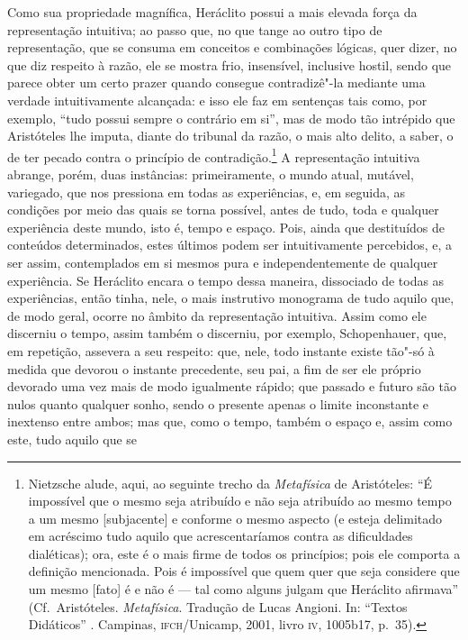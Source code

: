 Como sua propriedade magnífica, Heráclito possui a mais elevada força da
representação intuitiva; ao passo que, no que tange ao outro tipo de
representação, que se consuma em conceitos e combinações lógicas, quer dizer,
no que diz respeito à razão, ele se mostra frio, insensível, inclusive
hostil, sendo que parece obter um certo prazer quando consegue contradizê"-la
mediante uma verdade intuitivamente alcançada: e isso ele faz em sentenças
tais como, por exemplo, ``tudo possui sempre o contrário em si'', mas de modo
tão intrépido que Aristóteles lhe imputa, diante do tribunal da razão, o mais
alto delito, a saber, o de ter pecado contra o princípio de contradição.\footnote{
Nietzsche alude, aqui, ao seguinte trecho da \textit{Metafísica} de Aristóteles: 
``É impossível que o mesmo seja atribuído e não seja atribuído ao mesmo tempo 
a um mesmo [subjacente] e conforme o mesmo aspecto (e esteja delimitado 
em acréscimo tudo aquilo que acrescentaríamos contra as dificuldades dialéticas); 
ora, este é o mais firme de todos os princípios; pois ele comporta a definição 
mencionada. Pois é impossível que quem quer que seja considere que um mesmo [fato] 
é e não é --- tal como alguns julgam que Heráclito afirmava'' (Cf.~Aristóteles. 
\textit{Metafísica}. Tradução de Lucas Angioni. In: ``Textos Didáticos'' .
Campinas, \textsc{ifch}/Unicamp, 2001, livro \textsc{iv}, 1005b17, p.~35).} A
representação intuitiva abrange, porém, duas instâncias: primeiramente, o
mundo atual, mutável, variegado, que nos pressiona em todas as experiências,
e, em seguida, as condições por meio das quais se torna possível, antes de
tudo, toda e qualquer experiência deste mundo, isto é, tempo e espaço. Pois,
ainda que destituídos de conteúdos determinados, estes últimos podem ser
intuitivamente percebidos, e, a ser assim, contemplados em si mesmos pura e
independentemente de qualquer experiência. Se Heráclito encara o tempo dessa
maneira, dissociado de todas as experiências, então tinha, nele, o mais
instrutivo monograma de tudo aquilo que, de modo geral, ocorre no âmbito da
representação intuitiva. Assim como ele discerniu o tempo, assim também o
discerniu, por exemplo, Schopenhauer, que, em repetição, assevera a seu
respeito: que, nele, todo instante existe tão"-só à medida que devorou o
instante precedente, seu pai, a fim de ser ele próprio devorado uma vez mais
de modo igualmente rápido; que passado e futuro são tão nulos quanto qualquer
sonho, sendo o presente apenas o limite inconstante e inextenso entre ambos;
mas que, como o tempo, também o espaço e, assim como este, tudo aquilo que se
